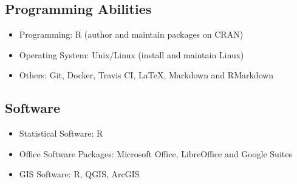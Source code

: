 \documentclass[11pt, a4paper]{awesome-cv}
\providecommand{\tightlist}{%
	\setlength{\itemsep}{0pt}\setlength{\parskip}{0pt}}
\begin{document}
\hypertarget{programming-abilities}{%
\subsection{Programming Abilities}\label{programming-abilities}}

\begin{itemize}
\tightlist
\item
  Programming: R (author and maintain packages on CRAN)
\item
  Operating System: Unix/Linux (install and maintain Linux)
\item
  Others: Git, Docker, Travis CI, LaTeX, Markdown and RMarkdown
\end{itemize}

\hypertarget{software}{%
\subsection{Software}\label{software}}

\begin{itemize}
\tightlist
\item
  Statistical Software: R
\item
  Office Software Packages: Microsoft Office, LibreOffice and Google Suites
\item
  GIS Software: R, QGIS, ArcGIS
\end{itemize}
\end{document}
